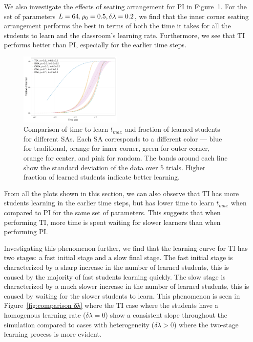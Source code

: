 \documentclass[twocolumn,secnumarabic,amssymb, nobibnotes, aps, prd]{revtex4-2}
\begin{document}
        We also investigate the effects of seating arrangement for PI in Figure~\ref{fig:comparison SA}.
        For the set of parameters $L=64,\space\rho_0=0.5,\space\delta\lambda=0.2$, we find that the inner corner seating arrangement performs the best in terms of both the time it takes for all the students to learn and the classroom's learning rate.
        Furthermore, we see that TI performs better than PI, especially for the earlier time steps.

        \begin{figure}[htbp!]
            \centering
            \includegraphics[width=0.45\textwidth]{figures/2D-BPCAIH-analysis/comparison plots/SA.png}
            \caption{Comparison of time to learn $t_{max}$ and fraction of learned students for different SAs.
            Each SA corresponds to a different color --- blue for traditional, orange for inner corner, green for outer corner, orange for center, and pink for random.
            The bands around each line show the standard deviation of the data over 5 trials.
            Higher fraction of learned students indicate better learning.}
            \label{fig:comparison SA}
        \end{figure}

        From all the plots shown in this section, we can also observe that TI has more students learning in the earlier time steps, but has lower time to learn $t_{max}$ when compared to PI for the same set of parameters.
        This suggests that when performing TI, more time is spent waiting for slower learners than when performing PI.

        Investigating this phenomenon further, we find that the learning curve for TI has two stages: a fast initial stage and a slow final stage.
        The fast initial stage is characterized by a sharp increase in the number of learned students, this is caused by the majority of fast students learning quickly.
        The slow stage is characterized by a much slower increase in the number of learned students, this is caused by waiting for the slower students to learn.
        This phenomenon is seen in Figure~\ref{fig:comparison δλ} where the TI case where the students have a homogenous learning rate ($\delta\lambda=0$) show a consistent slope throughout the simulation compared to cases with heterogeneity ($\delta\lambda>0$) where the two-stage learning process is more evident.
\end{document}
